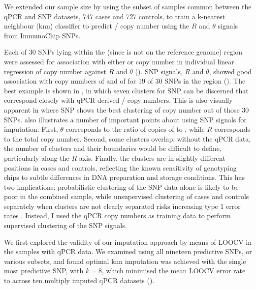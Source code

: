 We extended our sample size by using the subset of samples common between the qPCR and SNP datasets, 747 cases and 727 controls, to train a k-nearest neighbour (knn) classifier to predict / copy number using the $R$ and $\theta$ signals from ImmunoChip SNPs.

Each of 30 SNPs lying within the  (since  is not on the reference genome) region were assessed for association with either  or  copy number in individual linear regression of copy number against $R$ and $\theta$ ().
SNP signals, $R$ and $\theta$, showed good association with copy numbers of  and of  for 19 of 30 SNPs in the  region ().
The best example is shown in , in which seven clusters for SNP  can be discerned that correspond closely with qPCR derived
/ copy numbers.
This is also visually apparent in  where SNP  shows the best clustering of copy number out of those 30 SNPs.
 also illustrates a number of important points about using SNP signals for imputation.
First, $\theta$ corresponds to the ratio of copies of  to , while $R$ corresponds to the total copy number.
Second, some clusters overlap; without the qPCR data, the number of clusters and their boundaries would be difficult to define, particularly along the $R$ axis.
Finally, the clusters are in slightly different positions in cases and controls, reflecting the known sensitivity of genotyping chips to subtle differences in DNA preparation and storage conditions.
This has two implications: probabilistic clustering of the SNP data alone is likely to be poor in the combined sample, while unsupervised clustering of cases and controls separately when clusters are not clearly separated risks increasing type 1 error rates \citep{Plagnol:2007dw}.
Instead, I used the qPCR copy numbers as training data to perform supervised clustering of the SNP signals.

We first explored the validity of our imputation approach by means of \gls{LOOCV} in the samples with qPCR data.
We examined using all nineteen predictive SNPs, or various subsets, and found optimal knn imputation was achieved with the single most predictive SNP,
 with $k=8$, which minimised the mean \gls{LOOCV} error rate to  across ten multiply imputed qPCR datasets ().  

